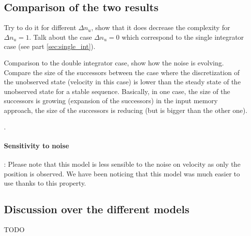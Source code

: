 \subsection{Comparison of the two results}

Try to do it for different $\Delta n_u$, show that it does decrease the complexity for $\Delta n_u = 1$. Talk about the case $\Delta n_u = 0$ which correspond to the single integrator case (see part \ref{sec:single_int}).

Comparison to the double integrator case, show how the noise is evolving. Compare the size of the successors between the case where the discretization of the unobserved state (velocity in this case) is lower than the steady state of the unobserved state for a stable sequence. Basically, in one case, the size of the successors is growing (expansion of the successors) in the input memory approach, the size of the successors is reducing (but is bigger than the other one).


.

\paragraph{Sensitivity to noise}:
Please note that this model is less sensible to the noise on velocity as only the position is observed.
We have been noticing that this model was much easier to use thanks to this property.

\subsection{Discussion over the different models}
TODO



